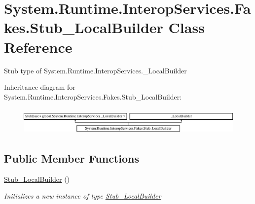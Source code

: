 \hypertarget{class_system_1_1_runtime_1_1_interop_services_1_1_fakes_1_1_stub___local_builder}{\section{System.\-Runtime.\-Interop\-Services.\-Fakes.\-Stub\-\_\-\-Local\-Builder Class Reference}
\label{class_system_1_1_runtime_1_1_interop_services_1_1_fakes_1_1_stub___local_builder}
}


Stub type of System.\-Runtime.\-Interop\-Services.\-\_\-\-Local\-Builder 


Inheritance diagram for System.\-Runtime.\-Interop\-Services.\-Fakes.\-Stub\-\_\-\-Local\-Builder\-:\begin{figure}[H]
\begin{center}
\leavevmode
\includegraphics[height=1.407035cm]{class_system_1_1_runtime_1_1_interop_services_1_1_fakes_1_1_stub___local_builder}
\end{center}
\end{figure}
\subsection*{Public Member Functions}
\begin{DoxyCompactItemize}
\item 
\hyperlink{class_system_1_1_runtime_1_1_interop_services_1_1_fakes_1_1_stub___local_builder_acf9d733421d568cbc61efcc36fd130f5}{Stub\-\_\-\-Local\-Builder} ()
\begin{DoxyCompactList}\small\item\em Initializes a new instance of type \hyperlink{class_system_1_1_runtime_1_1_interop_services_1_1_fakes_1_1_stub___local_builder}{Stub\-\_\-\-Local\-Builder}\end{DoxyCompactList}\end{DoxyCompactItemize}
